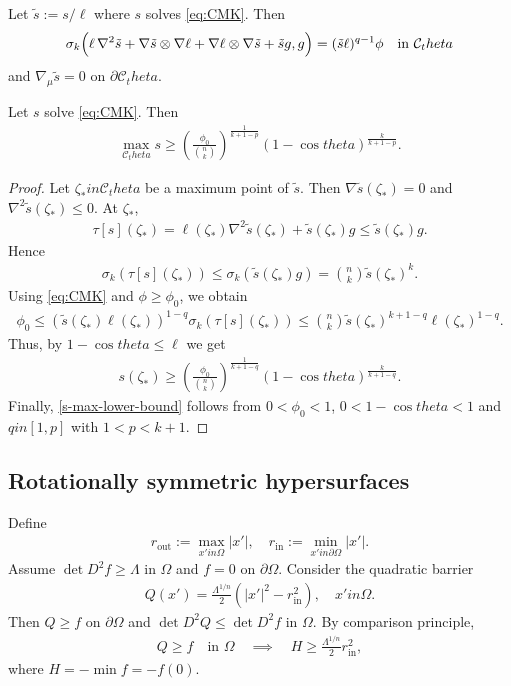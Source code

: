\documentclass[12pt]{amsart}
\def\theta{theta}%
\def\in{in }%
\numberwithin{equation}{section}
\newcommand{\8}{\infty}
\newcommand{\ze}{\zeta}
\newcommand{\Om}{\Omega}
\newcommand{\cC}{\mathcal{C}}
\newcommand{\eq}[1]{\begin{equation}\begin{alignedat}{2}#1\end{alignedat}\end{equation}}
\newcommand{\Cth}{\cC_\theta}
\newcommand{\bn}{\nabla}
\newcommand{\bHess}{\nabla^2}
\begin{document}
\begin{prop}\label{prop:ratio}
Let $\tilde{s}:=s/\ell$ where $s$ solves \eqref{eq:CMK}. Then
\eq{\label{eq:ratioPDE}
\sigma_k\Bigl(\ell\,\bHess \tilde{s} + \nabla \tilde{s}\otimes \nabla \ell + \nabla \ell\otimes \nabla \tilde{s} + \tilde{s}g,g\Bigr)
=(\tilde{s}\ell)^{q-1}\phi\quad\text{in }\Cth
}
and $\bn_{\mu}\tilde{s}=0$ on $\partial\Cth$.
\end{prop}

\begin{lemma}\label{thm:LowerMax}
Let $s$ solve \eqref{eq:CMK}. Then
\eq{ \label{s-max-lower-bound}
\max_{\Cth}s \ge \left(\frac{\phi_0}{\binom{n}{k}}\right)^{\frac{1}{k+1-p}}(1-\cos\theta)^{\frac{k}{k+1-p}}.
}
\end{lemma}

\begin{proof}
Let $\ze_\ast\in \Cth$ be a maximum point of $\tilde{s}$. Then $\bn \tilde{s}(\ze_\ast)=0$ and $\bHess \tilde{s}(\ze_\ast)\le 0$. At $\ze_\ast$,
\eq{
\tau[s](\ze_\ast)=\ell(\ze_\ast)\bHess \tilde{s}(\ze_\ast)+\tilde{s}(\ze_\ast) g \le \tilde{s}(\ze_\ast) g.
}
Hence
\eq{
\sigma_k(\tau[s](\ze_\ast))\le \sigma_k(\tilde{s}(\ze_\ast) g)=\binom{n}{k}\tilde{s}(\ze_\ast)^k.
}
Using \eqref{eq:CMK} and $\phi\ge\phi_0$, we obtain
\eq{
\phi_0\le (\tilde{s}(\ze_\ast)\ell(\ze_\ast))^{1-q}\sigma_k(\tau[s](\ze_\ast))
\le \binom{n}{k}\tilde{s}(\ze_\ast)^{k+1-q}\ell(\ze_\ast)^{1-q}.
}
Thus, by $1-\cos\theta\leq \ell$ we get
\eq{
s(\ze_\ast)\ge \left(\frac{\phi_0}{\binom{n}{k}}\right)^{\frac{1}{k+1-q}}(1-\cos\theta)^{\frac{k}{k+1-q}}.
}
Finally, \eqref{s-max-lower-bound} follows from $0<\phi_0<1$, $0<1-\cos\theta<1$ and $q\in [1,p]$ with $1<p<k+1$.
\end{proof}

\subsection{Rotationally symmetric hypersurfaces}

Define 
\eq{
r_{\mathrm{out}}:=\max_{x'\in\Omega}|x'|,\quad
r_{\mathrm{in}}:=\min_{x'\in\partial\Omega}|x'|.
}
Assume $\det D^2 f \ge \Lambda$ in $\Om$ and $f=0$ on $\partial\Om$. Consider the quadratic barrier
\eq{
Q(x')=\frac{\Lambda^{1/n}}{2}(|x'|^2-r_{\mathrm{in}}^2),\quad x'\in \Om.
}
Then $Q\ge f$ on $\partial\Om$ and $\det D^2 Q\le \det D^2 f$ in $\Omega$. By comparison principle,
\eq{\label{ineq: comparison-principle}
Q\ge f\quad\text{in }\Om \quad \implies \quad H\ge \frac{\Lambda^{1/n}}{2}r_{\mathrm{in}}^2,
}
where $H=-\min f=-f(0)$.
\end{document}
